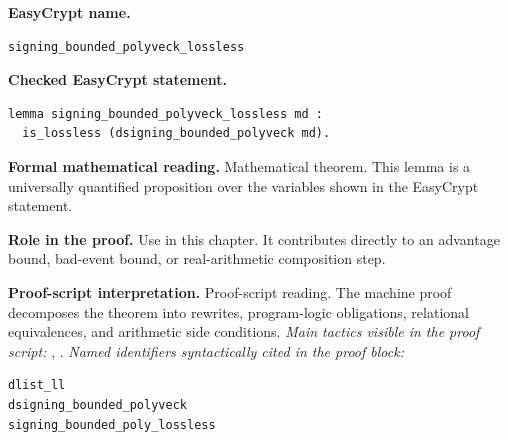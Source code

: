 \begin{formaltheorem}
\noindent\textbf{EasyCrypt name.}
\begin{lstlisting}[language=EasyCrypt,basicstyle=\ttfamily\scriptsize]
signing_bounded_polyveck_lossless
\end{lstlisting}
\noindent\textbf{Checked EasyCrypt statement.}
\begin{lstlisting}[language=EasyCrypt,basicstyle=\ttfamily\scriptsize]
lemma signing_bounded_polyveck_lossless md :
  is_lossless (dsigning_bounded_polyveck md).
\end{lstlisting}
\noindent\textbf{Formal mathematical reading.}
Mathematical theorem. This lemma is a universally quantified proposition over the variables shown in the EasyCrypt statement.

\noindent\textbf{Role in the proof.}
Use in this chapter. It contributes directly to an advantage bound, bad-event bound, or real-arithmetic composition step.

\noindent\textbf{Proof-script interpretation.}
Proof-script reading. The machine proof decomposes the theorem into rewrites, program-logic obligations, relational equivalences, and arithmetic side conditions.
\emph{Main tactics visible in the proof script:} , .
\emph{Named identifiers syntactically cited in the proof block:}
\begin{lstlisting}[language=EasyCrypt,basicstyle=\ttfamily\scriptsize]
dlist_ll
dsigning_bounded_polyveck
signing_bounded_poly_lossless
\end{lstlisting}

\end{formaltheorem}

